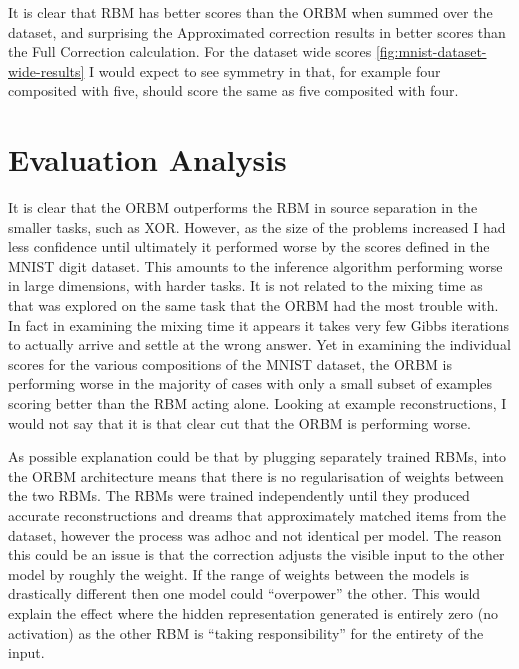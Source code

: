 It is clear that RBM has better scores than the ORBM when summed over the dataset, and surprising the Approximated correction results in better scores than the Full Correction calculation. For the dataset wide scores \ref{fig:mnist-dataset-wide-results} I would expect to see symmetry in that, for example four composited with five, should score the same as five composited with four.

\section{Evaluation Analysis}

It is clear that the ORBM outperforms the RBM in source separation in the smaller tasks, such as XOR. However, as the size of the problems increased I had less confidence until ultimately it performed worse by the scores defined in the MNIST digit dataset. This amounts to the inference algorithm performing worse in large dimensions, with harder tasks. It is not related to the mixing time as that was explored on the same task that the ORBM had the most trouble with. In fact in examining the mixing time it appears it takes very few Gibbs iterations to actually arrive and settle at the wrong answer.
Yet in examining the individual scores for the various compositions of the MNIST dataset, the ORBM is performing worse in the majority of cases with only a small subset of examples scoring better than the RBM acting alone. Looking at example reconstructions, I would not say that it is that clear cut that the ORBM is performing worse.

As possible explanation could be that by plugging separately trained RBMs, into the ORBM architecture means that there is no regularisation of weights between the two RBMs. The RBMs were trained independently until they produced accurate reconstructions and dreams that approximately matched items from the dataset, however the process was adhoc and not identical per model. The reason this could be an issue is that the correction adjusts the visible input to the other model by roughly the weight. If the range of weights between the models is drastically different then one model could ``overpower'' the other. This would explain the effect where the hidden representation generated is entirely zero (no activation) as the other RBM is ``taking responsibility'' for the entirety of the input.
